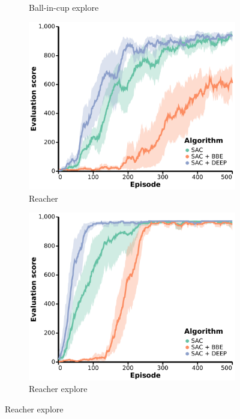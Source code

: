 \begin{figure}[ht]
\begin{subfigure}[b]{0.24\textwidth}
        \caption{Ball-in-cup explore}
    \end{subfigure}
    \hfill
    \begin{subfigure}[b]{0.24\textwidth}
        \centering
        \includegraphics[width=\textwidth]{figures/deep/neurips_reacher.pdf}
        \caption{Reacher}
    \end{subfigure}
    \begin{subfigure}[b]{0.24\textwidth}
        \centering
        \includegraphics[width=\textwidth]{figures/deep/neurips_reacher_explore.pdf}
        \caption{Reacher explore}
    \end{subfigure}
    \vspace{1em}


\end{figure}
